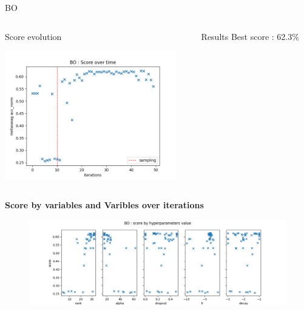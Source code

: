 \begin{frame}[allowframebreaks]{BO}
    
    \begin{columns}
    
        \begin{column}{0.6\textwidth}
            \begin{block}{Score evolution}
                
                \includegraphics[width = 7.5cm]{imgs/plots/exp12_score_over_time.png}
            
            \end{block}   
        \end{column}

        \begin{column}{0.4\textwidth}
            \begin{block}{Results}
                Best score : 62.3\%               
            \end{block}
             
        \end{column}
    \end{columns}    


    \framebreak

    \begin{columns}
    
        \begin{column}{0.65\textwidth}
            \textbf{Score by variables and Varibles over iterations}
                \begin{figure}[h]
                    \includegraphics[width = \textwidth]{imgs/plots/exp12_score_by_hp.png}
                \end{figure}     
        \end{column}


\end{columns}
\end{frame}
